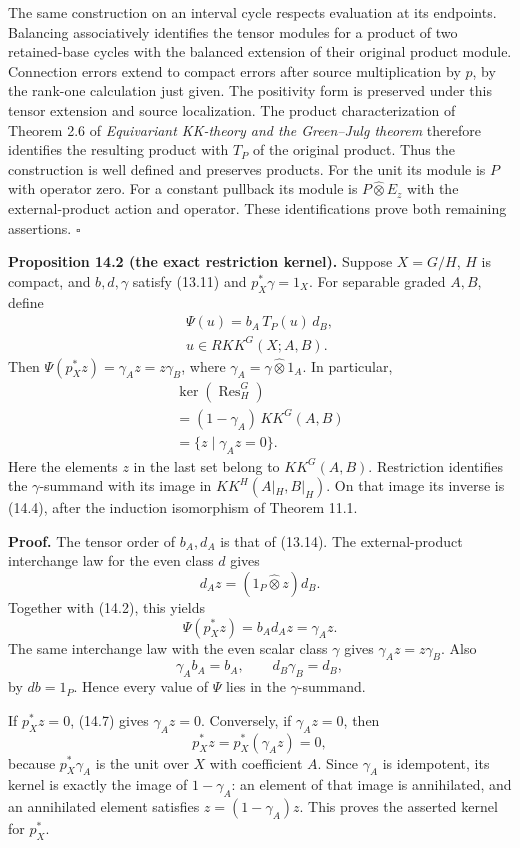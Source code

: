 \documentclass[
  11pt,
]{article}
\begin{document}
The same construction on an interval cycle respects evaluation at its
endpoints. Balancing associatively identifies the tensor modules for a
product of two retained-base cycles with the balanced extension of their
original product module. Connection errors extend to compact errors
after source multiplication by \(p\), by the rank-one calculation just
given. The positivity form is preserved under this tensor extension and
source localization. The product characterization of Theorem 2.6 of
\emph{Equivariant KK-theory and the Green--Julg theorem} therefore
identifies the resulting product with \(T_{P}\) of the original product.
Thus the construction is well defined and preserves products. For the
unit its module is \(P\) with operator zero. For a constant pullback its
module is \(P\widehat\otimes E_z\) with the external-product action and
operator. These identifications prove both remaining assertions.
\(\square\)

\textbf{Proposition 14.2 (the exact restriction kernel).} Suppose
\(X=G/H\), \(H\) is compact, and \(b,d,\gamma\) satisfy (13.11) and
\(p_X^*\gamma=1_X\). For separable graded \(A,B\), define \[
\begin{gathered}
\Psi(u)=b_A\,T_{P}(u)\,d_B,\\
u\in RKK^G(X;A,B).
\end{gathered}
\tag{14.4}
\] Then \(\Psi(p_X^*z)=\gamma_Az=z\gamma_B\), where
\(\gamma_A=\gamma\widehat\otimes1_A\). In particular, \[
\begin{gathered}
\ker(\operatorname{Res}_H^G)\\
=(1-\gamma_A)\,KK^G(A,B)\\
=\{z\mid\gamma_Az=0\}.
\end{gathered}
\tag{14.5}
\] Here the elements \(z\) in the last set belong to \(KK^G(A,B)\).
Restriction identifies the \(\gamma\)-summand with its image in
\(KK^H(A|_H,B|_H)\). On that image its inverse is (14.4), after the
induction isomorphism of Theorem 11.1.

\textbf{Proof.} The tensor order of \(b_A,d_A\) is that of (13.14). The
external-product interchange law for the even class \(d\) gives \[
d_Az=(1_{P}\widehat\otimes z)d_B.
\tag{14.6}
\] Together with (14.2), this yields \[
\Psi(p_X^*z)=b_Ad_Az=\gamma_Az.
\tag{14.7}
\] The same interchange law with the even scalar class \(\gamma\) gives
\(\gamma_Az=z\gamma_B\). Also \[
\gamma_Ab_A=b_A,\qquad d_B\gamma_B=d_B,
\tag{14.8}
\] by \(db=1_{P}\). Hence every value of \(\Psi\) lies in the
\(\gamma\)-summand.

If \(p_X^*z=0\), (14.7) gives \(\gamma_Az=0\). Conversely, if
\(\gamma_Az=0\), then \[
p_X^*z=p_X^*(\gamma_Az)=0,
\tag{14.9}
\] because \(p_X^*\gamma_A\) is the unit over \(X\) with coefficient
\(A\). Since \(\gamma_A\) is idempotent, its kernel is exactly the image
of \(1-\gamma_A\): an element of that image is annihilated, and an
annihilated element satisfies \(z=(1-\gamma_A)z\). This proves the
asserted kernel for \(p_X^*\).
\end{document}
